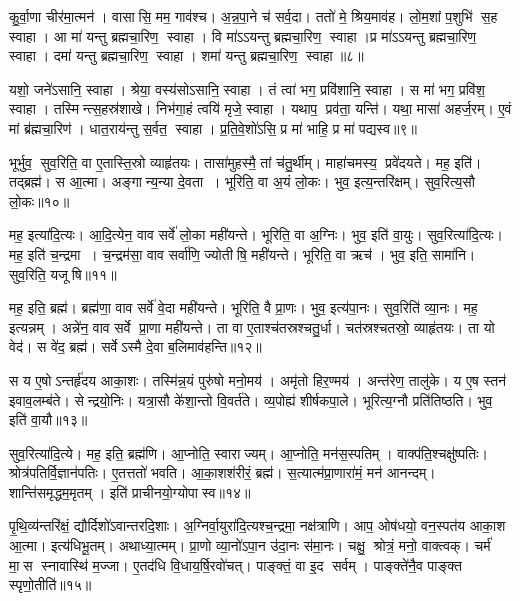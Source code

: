 कु॒र्वा॒णा चीर॑मा॒त्मन॑। वासासि॒ मम॒ गाव॑श्च। अ॒न्न॒पा॒ने च॑ सर्व॒दा। ततो॑ मे॒ श्रिय॒माव॑ह। लो॒म॒शां प॒शुभि॑ स॒ह स्वाहा। आ मा॑ यन्तु ब्रह्मचा॒रिण॒ स्वाहा। वि मा॑ऽऽयन्तु ब्रह्मचा॒रिण॒ स्वाहा।प्र मा॑ऽऽयन्तु ब्रह्मचा॒रिण॒ स्वाहा। दमा॑ यन्तु ब्रह्मचा॒रिण॒ स्वाहा। शमा॑ यन्तु ब्रह्मचा॒रिण॒ स्वाहा॥८॥

    यशो॒ जने॑ऽसानि॒ स्वाहा। श्रेया॒\an{} वस्य॑सोऽसानि॒ स्वाहा। तं त्वा॑ भग॒ प्रवि॑शानि॒ स्वाहा। स मा॑ भग॒ प्रवि॑श॒ स्वाहा। तस्मिन्त्स॒हस्र॑शाखे। निभ॑गा॒हं त्वयि॑ मृजे॒ स्वाहा। यथाप॒ प्रव॑ता॒ यन्ति॑। यथा॒ मासा॑ अहर्ज॒रम्। ए॒वं मां ब्र॑ह्मचा॒रिण॑। धात॒राय॑न्तु स॒र्वत॒ स्वाहा। प्र॒ति॒वे॒शो॑ऽसि॒ प्र मा॑ भाहि॒ प्र मा॑ पद्यस्व॥९॥
\anuvakamend%

भूर्भुव॒ सुव॒रिति॒ वा ए॒तास्ति॒स्रो व्याहृ॑तयः। तासा॑मुहस्मै॒ तां च॑तु॒र्थीम्। माहा॑चमस्य॒ प्रवे॑दयते। मह॒ इति॑। तद्ब्रह्म॑। स आ॒त्मा। अङ्गान्य॒न्या दे॒वता। भूरिति॒ वा अ॒यं लो॒कः। भुव॒ इत्य॒न्तरि॑क्षम्। सुव॒रित्य॒सौ लो॒कः॥१०॥

मह॒ इत्या॑दि॒त्यः। आ॒दि॒त्येन॒ वाव सर्वे॑ लो॒का मही॑यन्ते। भूरिति॒ वा अ॒ग्निः। भुव॒ इति॑ वा॒युः। सुव॒रित्या॑दि॒त्यः। मह॒ इति॑ च॒न्द्रमा। च॒न्द्रम॑सा॒ वाव सर्वा॑णि॒ ज्योतीषि॒ मही॑यन्ते। भूरिति॒ वा ऋच॑। भुव॒ इति॒ सामा॑नि। सुव॒रिति॒ यजूषि॥११॥

मह॒ इति॒ ब्रह्म॑। ब्रह्म॑णा॒ वाव सर्वे॑ वे॒दा मही॑यन्ते। भूरिति॒ वै प्रा॒णः। भुव॒ इत्य॑पा॒नः। सुव॒रिति॑ व्या॒नः। मह॒ इत्यन्नम्। अन्ने॑न॒ वाव सर्वे प्रा॒णा मही॑यन्ते। ता वा ए॒ताश्च॑तस्रश्चतु॒र्धा। चत॑स्रश्चतस्रो॒ व्याहृ॑तयः। ता यो वेद॑। स वे॑द॒ ब्रह्म॑। सर्वेऽस्मै दे॒वा ब॒लिमाव॑हन्ति॥१२॥
\anuvakamend[अ॒सौ लो॒को यजूषि॒ वेद॒ द्वे च॑]

स य ए॒षोऽन्तर्\mbox{}हृ॑दय आका॒शः। तस्मि॑न्न॒यं पुरु॑षो मनो॒मय॑। अमृ॑तो हिर॒ण्मय॑। अन्त॑रेण॒ तालु॑के। य ए॒ष स्तन॑ इवाव॒लम्ब॑ते। सेन्द्रयो॒निः। यत्रा॒सौ के॑शा॒न्तो वि॒वर्त॑ते। व्य॒पोह्य॑ शीर्\mbox{}षकपा॒ले। भूरित्य॒ग्नौ प्रति॑तिष्ठति। भुव॒ इति॑ वा॒यौ॥१३॥

सुव॒रित्या॑दि॒त्ये। मह॒ इति॒ ब्रह्म॑णि। आ॒प्नोति॒ स्वाराज्यम्। आ॒प्नोति॒ मन॑स॒स्पतिम्। वाक्प॑ति॒श्चक्षु॑ष्पतिः। श्रोत्र॑पतिर्वि॒ज्ञान॑पतिः। ए॒तत्ततो॑ भवति। आ॒का॒शश॑रीरं॒ ब्रह्म॑। स॒त्यात्म॑प्रा॒णारा॑मं॒ मन॑ आनन्दम्। शान्ति॑समृद्धम॒मृतम्। इति॑ प्राचीनयो॒ग्योपास्व॥१४॥
\anuvakamend[वा॒याव॒मृत॒मेकं॑ च]

पृ॒थि॒व्य॑न्तरि॑क्षं॒ द्यौर्दिशो॑ऽवान्तरदि॒शाः। अ॒ग्निर्वा॒युरा॑दि॒त्यश्च॒न्द्रमा॒ नक्ष॑त्राणि। आप॒ ओष॑धयो॒ वन॒स्पत॑य आका॒श आ॒त्मा। इत्य॑धिभू॒तम्। अथाध्या॒त्मम्। प्रा॒णो व्या॒नो॑ऽपा॒न उ॑दा॒नः स॑मा॒नः। चक्षु॒ श्रोत्रं॒ मनो॒ वाक्त्वक्। चर्म॑ मा॒स स्नावास्थि॑ म॒ज्जा। ए॒तद॑धि वि॒धाय॒र्\mbox{}षि॒रवो॑चत्। पाङ्क्तं॒ वा इ॒द सर्वम्। पाङ्क्ते॑नै॒व पाङ्क्त स्पृणो॒तीति॑॥१५॥
\anuvakamend[सर्व॒मेकं॑ च]

